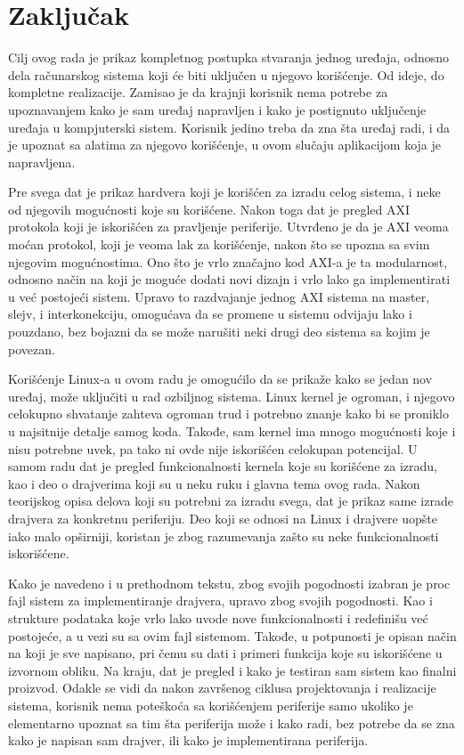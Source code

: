 \documentclass[a4paper, 12pt, diplomski]{etf}
\begin{document}
	\newpage

	\chapter{Zaključak}

		Cilj ovog rada je prikaz kompletnog postupka stvaranja jednog uređaja, odnosno dela računarskog sistema koji će biti uključen u njegovo korišćenje. Od ideje, do kompletne realizacije. Zamisao je da krajnji korisnik nema potrebe za upoznavanjem kako je sam uređaj napravljen i kako je postignuto uključenje uređaja u kompjuterski sistem. Korisnik jedino treba da zna šta uređaj radi, i da je upoznat sa alatima za njegovo korišćenje, u ovom slučaju aplikacijom koja je napravljena.

		Pre svega dat je prikaz hardvera koji je korišćen za izradu celog sistema, i neke od njegovih mogućnosti koje su korišćene. Nakon toga dat je pregled AXI protokola koji je iskorišćen za pravljenje periferije. Utvrđeno je da je AXI veoma moćan protokol, koji je veoma lak za korišćenje, nakon što se upozna sa svim njegovim mogućnostima. Ono što je vrlo značajno kod AXI-a je ta modularnost, odnosno način na koji je moguće dodati novi dizajn i vrlo lako ga implementirati u već postojeći sistem. Upravo to razdvajanje jednog AXI sistema na master, slejv, i interkonekciju, omogućava da se promene u sistemu odvijaju lako i pouzdano, bez bojazni da se može narušiti neki drugi deo sistema sa kojim je povezan.

		Korišćenje Linux-a u ovom radu je omogućilo da se prikaže kako se jedan nov uređaj, može uključiti u rad ozbiljnog sistema. Linux kernel je ogroman, i njegovo celokupno shvatanje zahteva ogroman trud i potrebno znanje kako bi se proniklo u najsitnije detalje samog koda. Takođe, sam kernel ima mnogo mogućnosti koje i nisu potrebne uvek, pa tako ni ovde nije iskorišćen celokupan potencijal. U samom radu dat je pregled funkcionalnosti kernela koje su korišćene za izradu, kao i deo o drajverima koji su u neku ruku i glavna tema ovog rada. Nakon teorijskog opisa delova koji su potrebni za izradu svega, dat je prikaz same izrade drajvera za konkretnu periferiju. Deo koji se odnosi na Linux i drajvere uopšte iako malo opširniji, koristan je zbog razumevanja zašto su neke funkcionalnosti iskorišćene.

		Kako je navedeno i u prethodnom tekstu, zbog svojih pogodnosti izabran je proc fajl sistem za implementiranje drajvera, upravo zbog svojih pogodnosti. Kao i strukture podataka koje vrlo lako uvode nove funkcionalnosti i redefinišu već postojeće, a u vezi su sa ovim fajl sistemom. Takođe, u potpunosti je opisan način na koji je sve napisano, pri čemu su dati i primeri funkcija koje su iskorišćene u izvornom obliku. Na kraju, dat je pregled i kako je testiran sam sistem kao finalni proizvod. Odakle se vidi da nakon završenog ciklusa projektovanja  i realizacije sistema, korisnik nema poteškoća sa korišćenjem periferije samo ukoliko je elementarno upoznat sa tim šta periferija može i kako radi, bez potrebe da se zna kako je napisan sam drajver, ili kako je implementirana periferija.
\end{document}
